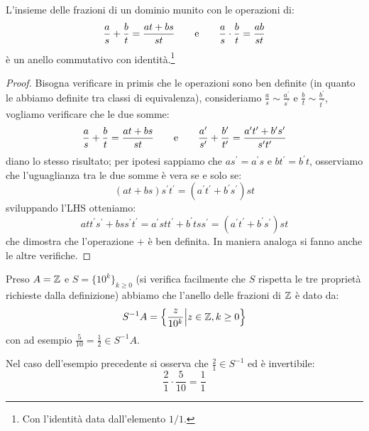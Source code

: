 \documentclass[11pt]{scrartcl}
\begin{document}
\begin{proposition}
    L'insieme delle frazioni di un dominio munito con le operazioni di:
    \[ \frac{a}{s} + \frac{b}{t} = \frac{at+bs}{st} \qquad \text e \qquad \frac{a}{s} \cdot \frac{b}{t} = \frac{ab}{st}
        \]
    è un anello commutativo con identità.\footnote{Con l'identità data dall'elemento $1/1$.}
\end{proposition}

\begin{proof}
    Bisogna verificare in primis che le operazioni sono ben definite (in quanto le abbiamo definite tra classi di equivalenza), consideriamo $\displaystyle\frac{a}{s}\sim\frac{a^{\prime}}{s^{\prime}}$ e
    $\displaystyle\frac{b}{t}\sim\frac{b^{\prime}}{t^{\prime}}$, vogliamo verificare che le due somme:
    \[ \frac{a}{s} + \frac{b}{t} = \frac{at+bs}{st} \qquad \text e \qquad \frac{a^{\prime}}{s^{\prime}} + \frac{b^{\prime}}{t^{\prime}} = \frac{a^{\prime}t^{\prime}+b^{\prime}s^{\prime}}{s^{\prime}t^{\prime}}
        \]
    diano lo stesso risultato; per ipotesi sappiamo che $as^{\prime}=a^{\prime}s$ e $bt^{\prime}=b^{\prime}t$, osserviamo che l'uguaglianza tra le due somme è vera se e solo se:
    \[ (at+bs)s^{\prime}t^{\prime} = (a^{\prime}t^{\prime}+b^{\prime}s^{\prime})st
        \]
    sviluppando l'LHS otteniamo:
    \[ att^{\prime}s^{\prime} + bss^{\prime}t^{\prime} = a^{\prime}stt^{\prime}+b^{\prime}tss^{\prime} = (a^{\prime}t^{\prime}+b^{\prime}s^{\prime})st
        \]
    che dimostra che l'operazione $+$ è ben definita. In maniera analoga si fanno anche le altre verifiche.
\end{proof}

\begin{example}
    Preso $A = \mathbb Z$ e $S = \{10^k\}_{k\geq 0}$ (si verifica facilmente che $S$ rispetta le tre proprietà richieste dalla definizione) abbiamo che l'anello delle frazioni di $\mathbb Z$ è dato da:
    \[ S^{-1}A = \left\{\frac{z}{10^k} \middle| z \in \mathbb Z, k \geq 0\right\}
        \]
    con ad esempio $\displaystyle \frac{5}{10} = \frac{1}{2} \in S^{-1}A$.
\end{example}

\begin{remark}
    Nel caso dell'esempio precedente si osserva che $\displaystyle\frac{2}{1} \in S^{-1}$ ed è invertibile:
        \[\frac{2}{1} \cdot \frac{5}{10} = \frac{1}{1}
            \]
\end{remark}
\end{document}
